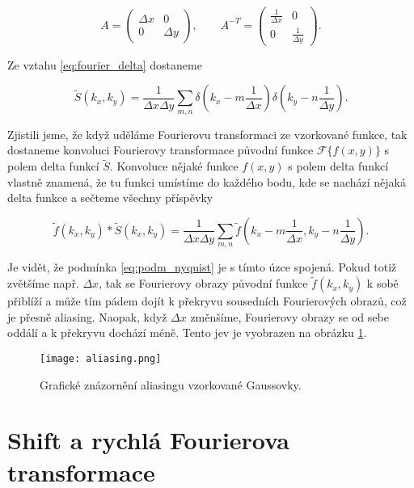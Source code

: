 \begin{equation}
A = 
\begin{pmatrix}
\Delta x & 0 \\
0 & \Delta y
\end{pmatrix} , \qquad
A^{-T} = 
\begin{pmatrix}
\frac{1}{\Delta x} & 0 \\
0 & \frac{1}{\Delta y}
\end{pmatrix}.
\end{equation}

Ze vztahu \eqref{eq:fourier_delta} dostaneme

\begin{equation}
\widetilde{S}(k_x,k_y) = \frac{1}{\Delta x \Delta y} \sum\limits_{m,n} \delta \left(k_x - m\frac{1}{\Delta x} \right) \delta \left(k_y - n\frac{1}{\Delta y} \right).
\end{equation}

Zjistili jsme, že když uděláme Fourierovu transformaci ze vzorkované funkce, tak dostaneme konvoluci Fourierovy transformace původní funkce $\mathscr{F}\{f(x,y)\}$ s polem delta funkcí $\widetilde{S}$. Konvoluce nějaké funkce $f(x,y)$ s polem delta funkcí vlastně znamená, že tu funkci umístíme do každého bodu, kde se nachází nějaká delta funkce a sečteme všechny příspěvky

\begin{equation}
\widetilde{f}(k_x,k_y) \ast \widetilde{S}(k_x,k_y) =  \frac{1}{\Delta x \Delta y} \sum\limits_{m,n} \widetilde{f}\left(k_x - m\frac{1}{\Delta x},k_y- n\frac{1}{\Delta y} \right).
\end{equation} 

Je vidět, že podmínka \eqref{eq:podm_nyquist} je s tímto úzce spojená. Pokud totiž zvětšíme např. $\Delta x$, tak se Fourierovy obrazy původní funkce $\widetilde{f}(k_x,k_y)$ k sobě přiblíží a může tím pádem dojít k překryvu sousedních Fourierových obrazů, což je přesně aliasing. Naopak, když $\Delta x$ změnšíme, Fourierovy obrazy se od sebe oddálí a k překryvu dochází méně. Tento jev je vyobrazen na obrázku \ref{fig:aliasing}.  

\begin{figure}[h]
\centering
\texttt{[image: aliasing.png]}
\caption{Grafické znázornění aliasingu vzorkované Gaussovky.}
\label{fig:aliasing}
\end{figure}


\section{Shift a rychlá Fourierova transformace}

